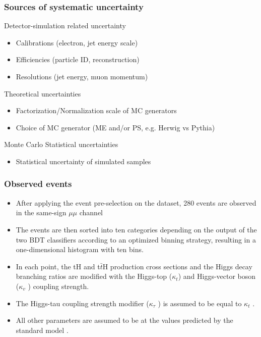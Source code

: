 \documentclass[11pt]{beamer}
\begin{document}
\begin{frame}
\frametitle{Sources of systematic uncertainty}
Detector-simulation related uncertainty
\begin{itemize}
\item Calibrations (electron, jet energy scale)
\item Efficiencies (particle ID, reconstruction)
\item Resolutions (jet energy, muon momentum)
\end{itemize}
Theoretical uncertainties
\begin{itemize}
\item  Factorization/Normalization scale of MC generators
\item Choice of MC generator (ME and/or PS, e.g. Herwig vs Pythia)
\end{itemize}
Monte Carlo Statistical uncertainties
\begin{itemize}\item Statistical uncertainty of simulated samples\cite{2} \end{itemize}
\end{frame}

\begin{frame}
\frametitle{Observed events }
\begin{itemize}
	\item After applying the event pre-selection on the dataset, 280 events are observed in the same-sign $\mu\mu$ channel
	\item The events are then sorted into ten categories depending on the output of the two BDT classifiers
	according to an optimized binning strategy, resulting in a one-dimensional histogram with ten
	bins.
	\item In each point, the tH and t$\bar{t}$H production cross sections and the Higgs decay branching ratios are modified with the Higgs-top ($\kappa_t$) and Higgs-vector boson ($\kappa_v$ ) coupling strength.
	\item  The Higgs-tau coupling strength modifier ($\kappa_\tau$ ) is assumed to be equal to $\kappa_t$ . 
	\item All other parameters are assumed to be at the values predicted by the standard model\cite{1}	.
\end{itemize}
\end{frame}
\end{document}

